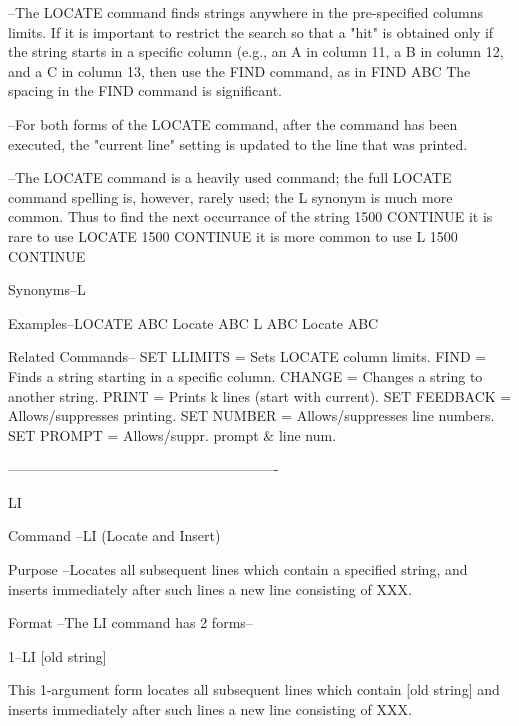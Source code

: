         --The LOCATE command finds strings anywhere
          in the pre-specified columns limits.  If it
          is important to restrict the search so
          that a "hit" is obtained only if the string
          starts in a specific column (e.g., an A in column
          11, a B in column 12, and a C in column 13,
          then use the FIND command, as in
             FIND           ABC
          The spacing in the FIND command is significant.
 
        --For both forms of the LOCATE command, after the
          command has been executed, the "current line"
          setting is updated to the line that was
          printed.
 
        --The LOCATE command is a heavily used command;
          the full LOCATE command spelling is, however,
          rarely used; the    L    synonym is much more
          common.  Thus to find the next occurrance of
          the string     1500 CONTINUE
          it is rare to use
             LOCATE 1500 CONTINUE
          it is more common to use
             L 1500 CONTINUE
 
Synonyms--L
 
Examples--LOCATE ABC       Locate ABC
          L ABC            Locate ABC
 
Related Commands--
          SET LLIMITS     = Sets LOCATE column limits.
          FIND            = Finds a string starting in a specific column.
          CHANGE          = Changes a string to another string.
          PRINT           = Prints k lines (start with current).
          SET FEEDBACK    = Allows/suppresses printing.
          SET NUMBER      = Allows/suppresses line numbers.
          SET PROMPT      = Allows/suppr. prompt & line num.
 
----------------------------------------------------------
 
LI
 
Command --LI (Locate and Insert)
 
Purpose --Locates all subsequent lines
          which contain a specified string, and
          inserts immediately after such
          lines a new line consisting of XXX.
 
Format  --The LI command has 2 forms--
 
       1--LI     [old string]
 
          This 1-argument form locates
          all subsequent lines which
          contain [old string] and inserts
          immediately after such lines
          a new line consisting of XXX.
 
